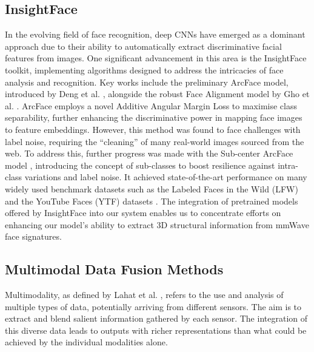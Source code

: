 \documentclass{mpaper}
\begin{document}
\subsection{InsightFace}
\label{background:insightface}
In the evolving field of face recognition, deep CNNs have emerged as a dominant approach due to their ability to automatically extract discriminative facial features from images. One significant advancement in this area is the InsightFace toolkit, implementing algorithms designed to address the intricacies of face analysis and recognition. Key works include the preliminary ArcFace model, introduced by Deng et al. \cite{deng2018arcface}, alongside the robust Face Alignment model by Gho et al. \cite{guo2018stacked}. ArcFace employs a novel Additive Angular Margin Loss to maximise class separability, further enhancing the discriminative power in mapping face images to feature embeddings. However, this method was found to face challenges with label noise, requiring the ``cleaning'' of many real-world images sourced from the web. To address this, further progress was made with the Sub-center ArcFace model \cite{deng2020subcenter}, introducing the concept of sub-classes to boost resilience against intra-class variations and label noise. It achieved state-of-the-art performance on many widely used benchmark datasets such as the Labeled Faces in the Wild (LFW) \cite{huang2008labeled} and the YouTube Faces (YTF) datasets \cite{wolf2011face}. The integration of pretrained models offered by InsightFace into our system enables us to concentrate efforts on enhancing our model's ability to extract 3D structural information from mmWave face signatures. 


\subsection{Multimodal Data Fusion Methods}
Multimodality, as defined by Lahat et al. \cite{lahat2015multimodal}, refers to the use and analysis of multiple types of data, potentially arriving from different sensors. The aim is to extract and blend salient information gathered by each sensor. The integration of this diverse data leads to outputs with richer representations than what could be achieved by the individual modalities alone. 
\end{document}
